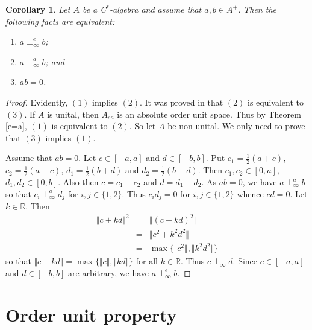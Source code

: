 \documentclass[12pt]{amsart}
\newtheorem{corollary}[theorem]{Corollary}
\begin{document}
\begin{corollary}
	Let $A$ be a C$^*$-algebra and assume that $a, b \in A^+$. Then the following facts are equivalent: 
	\begin{enumerate}
		\item $a \perp_{\infty}^e b$; 
		\item $a \perp_{\infty}^a b$; and 
		\item $a b = 0$.
	\end{enumerate}
\end{corollary} 
\begin{proof}
	Evidently, $(1)$ implies $(2)$. It was proved in \cite{K16, K18} that $(2)$ is equivalent to $(3)$. If $A$ is unital, then $A_{sa}$ is an absolute order unit space. Thus by Theorem \ref{e=a}, $(1)$ is equivalent to $(2)$. So let $A$ be non-unital. We only need to prove that $(3)$ implies $(1)$. 
	
	Assume that $a b = 0$. Let $c \in [- a, a]$ and $d \in [- b, b]$. Put $c_1 = \frac 12 (a + c)$, $c_2 = \frac 12 (a - c)$, $d_1 = \frac 12 (b + d)$ and $d_2 = \frac 12 (b - d)$. Then $c_1, c_2 \in [0, a]$, $d_1, d_2 \in [0, b]$. Also then $c = c_1 - c_2$ and $d = d_1 - d_2$. As $a b = 0$, we have $a \perp_{\infty}^a b$ so that $c_i \perp_{\infty}^a d_j$ for $i, j \in \lbrace 1, 2 \rbrace$. Thus $c_i d_j = 0$ for $i, j \in \lbrace 1, 2 \rbrace$ whence $c d = 0$. Let $k \in \mathbb{R}$. Then 
	\begin{eqnarray*}
		\Vert c + k d \Vert^2 &=& \Vert (c + k d)^2 \Vert \\
		&=& \Vert c^2 + k^2 d^2 \Vert \\ 
		&=& \max \lbrace \Vert c^2 \Vert, \Vert k^2 d^2 \Vert \rbrace %
	\end{eqnarray*} 
	so that $\Vert c + k d \Vert = \max \lbrace \Vert c \Vert, \Vert k d \Vert \rbrace$ for all $k \in \mathbb{R}$. Thus $c \perp_{\infty} d$. Since $c \in [-a, a]$ and $d \in [- b, b]$ are arbitrary, we have $a \perp_{\infty}^e b$. 
\end{proof}

\section{Order unit property}
\end{document}
